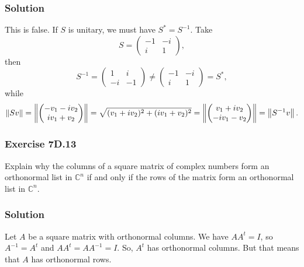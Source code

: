 \subsubsection*{Solution}

This is false.
If $S$ is unitary, we must have $S^* = S^{-1}$.
Take
\begin{equation*}
    S = \begin{pmatrix}
        -1 & -i \\
        i & 1
    \end{pmatrix},
\end{equation*}
then
\begin{equation*}
    S^{-1}
        = \begin{pmatrix}
            1 & i \\
            -i & -1
        \end{pmatrix}
        \neq \begin{pmatrix}
            -1 & -i \\
            i & 1
        \end{pmatrix}
        = S^*,
\end{equation*}
while
\begin{equation*}
    \left\lVert Sv\right\rVert
        = \left\lVert\begin{pmatrix}
            -v_1 - iv_2 \\
            iv_1 + v_2
        \end{pmatrix}\right\rVert
        = \sqrt{(v_1 + iv_2)^2 + (iv_1 + v_2)^2}
        = \left\lVert\begin{pmatrix}
            v_1 + iv_2 \\
            -iv_1 - v_2
        \end{pmatrix}\right\rVert
        = \left\lVert S^{-1}v\right\rVert.
\end{equation*}


\subsubsection*{Exercise 7D.13}

Explain why the columns of a square matrix of complex numbers form an orthonormal list in $\mathbb{C}^n$ if and only if the rows of the matrix form an orthonormal list in $\mathbb{C}^n$.

\subsubsection*{Solution}

Let $A$ be a square matrix with orthonormal columns.
We have $AA^t = I$, so $A^{-1} = A^t$ and $AA^t = AA^{-1} = I$.
So, $A^t$ has orthonormal columns.
But that means that $A$ has orthonormal rows.


